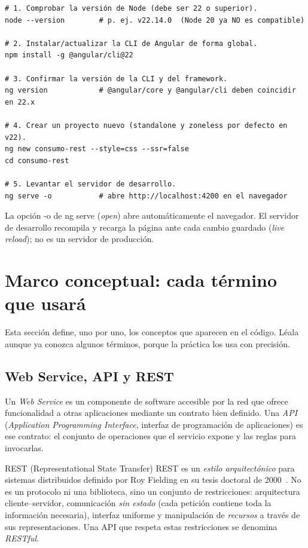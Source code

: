 \documentclass[11pt,a4paper]{article}
\newcommand{\code}[1]{{\ttfamily\color{ngdark}#1}}
\begin{document}
\begin{lstlisting}[caption={Verificación e instalación del entorno.},label={lst:entorno}]
# 1. Comprobar la versión de Node (debe ser 22 o superior).
node --version        # p. ej. v22.14.0  (Node 20 ya NO es compatible)

# 2. Instalar/actualizar la CLI de Angular de forma global.
npm install -g @angular/cli@22

# 3. Confirmar la versión de la CLI y del framework.
ng version            # @angular/core y @angular/cli deben coincidir en 22.x

# 4. Crear un proyecto nuevo (standalone y zoneless por defecto en v22).
ng new consumo-rest --style=css --ssr=false
cd consumo-rest

# 5. Levantar el servidor de desarrollo.
ng serve -o           # abre http://localhost:4200 en el navegador
\end{lstlisting}

\begin{nota}
	La opción \code{-o} de \code{ng serve} (\emph{open}) abre automáticamente el navegador. El servidor de desarrollo recompila y recarga la página ante cada cambio guardado (\emph{live reload}); no es un servidor de producción.
\end{nota}

\section{Marco conceptual: cada término que usará}

Esta sección define, uno por uno, los conceptos que aparecen en el código. Léala aunque ya conozca algunos términos, porque la práctica los usa con precisión.

\subsection{Web Service, API y REST}

Un \emph{Web Service} es un componente de software accesible por la red que ofrece funcionalidad a otras aplicaciones mediante un contrato bien definido. Una \emph{API} (\emph{Application Programming Interface}, interfaz de programación de aplicaciones) es ese contrato: el conjunto de operaciones que el servicio expone y las reglas para invocarlas.

\begin{concepto}{REST (Representational State Transfer)}
	REST es un \emph{estilo arquitectónico} para sistemas distribuidos definido por Roy Fielding en su tesis doctoral de 2000~\cite{fielding2000rest}. No es un protocolo ni una biblioteca, sino un conjunto de restricciones: arquitectura cliente--servidor, comunicación \emph{sin estado} (cada petición contiene toda la información necesaria), interfaz uniforme y manipulación de \emph{recursos} a través de sus representaciones. Una API que respeta estas restricciones se denomina \emph{RESTful}.
\end{concepto}
\end{document}

